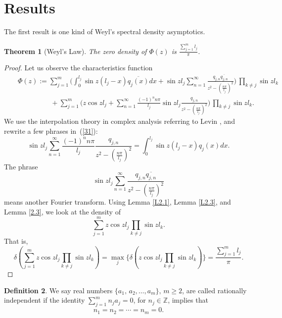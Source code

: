 \documentclass[10pt,a4paper]{article}
\theoremstyle{plain}
\newtheorem{theorem}{Theorem}[section]
\theoremstyle{definition}
\newtheorem{definition}[theorem]{Definition}
\theoremstyle{remark}
\numberwithin{equation}{section}
\begin{document}
\section{Results}
The first result is one kind of Weyl's spectral density asymptotics.
\begin{theorem}[Weyl's Law]\label{T31}
The zero density of $\Phi(z)$ is $\frac{\sum_{j=1}^{m}l_{j}}{\pi}$.
\end{theorem}
\begin{proof}
Let us observe the characteristics function
\begin{eqnarray}\nonumber
&&\Phi(z):=\sum_{j=1}^{m}\Big(\int_{0}^{l_{j}}\sin{z(l_{j}-x)}\overline{q_{j}(x)}dx+\sin{z l_{j}}\sum_{n=1}^{\infty}\frac{q_{j,n}\overline{q_{j,n}}}{z^{2}-(\frac{n\pi}{l_{j}})^{2}}\Big)\,\prod_{k\neq j}\sin{z l_{k}}\\
&&\hspace{57pt}+\sum_{j=1}^{m}\Big(z\cos{z l_{j}}+\sum_{n=1}^{\infty}\frac{(-1)^{n}n\pi}{l_{j}}\sin{z l_{j}}\frac{q_{j,n}}{z^{2}-(\frac{n\pi}{l_{j}})^{2}}\Big)\,\prod_{k\neq j}\sin{z l_{k}}.\label{31}
\end{eqnarray}
We use the interpolation theory in complex analysis referring to Levin \cite[p.\,150,\,151]{Levin2}, and rewrite a few phrases in~(\ref{31}):
\begin{equation}
\sin{z l_{j}}\sum_{n=1}^{\infty}\frac{(-1)^{n}n\pi}{l_{j}}\frac{q_{j,n}}{z^{2}-(\frac{n\pi}{l_{j}})^{2}}=\int_{0}^{l_{j}}\sin{z(l_{j}-x)}q_{j}(x)dx.
\end{equation}
The phrase $$\sin{z l_{j}}\sum_{n=1}^{\infty}\frac{q_{j,n}\overline{q_{j,n}}}{z^{2}-(\frac{n\pi}{l_{j}})^{2}}$$ means another Fourier transform. Using Lemma \ref{L2.1}, Lemma \ref{L2.3}, and Lemma \ref{2.3}, we look at the density of 
$$\sum_{j=1}^{m}z\cos{z l_{j}}\prod_{k\neq j}\sin{z l_{k}}.$$
That is,
\begin{equation}\nonumber
\delta(\sum_{j=1}^{m}z\cos{z l_{j}}\prod_{k\neq j}\sin{z l_{k}})=\max_{j}\{\delta(z\cos{z l_{j}}\prod_{k\neq j}\sin{z l_{k}})\}=\frac{\sum_{j=1}^{m}l_{j}}{\pi}.
\end{equation}
\end{proof}
\begin{definition}
We say real numbers $\{a_{1},\,a_{2},\ldots, a_{m}\},\,m\geq 2$, are called rationally independent if the identity $ \sum_{j=1}^{m}n_{j} a_{j}=0$,  for $n_{j}\in\mathbb{Z}$, implies that $$n_{1}=n_{2}=\cdots=n_{m}=0.$$
\end{definition}
\end{document}
